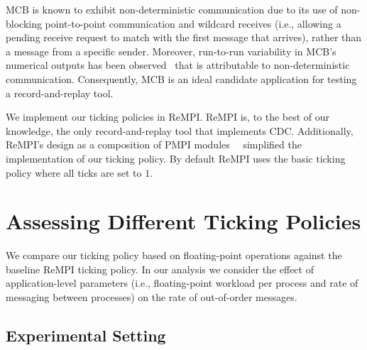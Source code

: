 MCB is known to exhibit non-deterministic communication due to its use
of non-blocking point-to-point communication and wildcard receives
(i.e., allowing a pending receive request to match with the first
message that arrives), rather than a message from a specific
sender. Moreover, run-to-run variability in MCB's numerical outputs
has been observed~\cite{Reproducibility:Cleveland:2013} that is
attributable to non-deterministic communication. Consequently, MCB is
an ideal candidate application for testing a record-and-replay tool.

We implement our ticking policies in ReMPI. ReMPI is, to the best
of our knowledge, the only record-and-replay tool that implements
CDC. Additionally, ReMPI's design as a composition of PMPI
modules~\cite{PMPI:Dongarra:1995}~\cite{PNMPI:Schulz:2007} simplified
the implementation of our ticking policy. By default ReMPI uses
the basic ticking policy where all ticks are set to $1$.

\section{Assessing Different Ticking Policies}

We compare our ticking policy based on floating-point operations
against the baseline ReMPI ticking policy. In our analysis we consider
the effect of application-level parameters (i.e., floating-point
workload per process and rate of messaging between processes) on the
rate of out-of-order messages.

\subsection{Experimental Setting}


